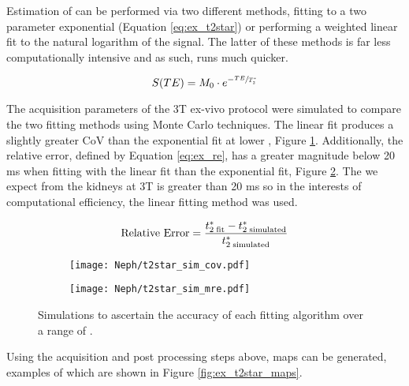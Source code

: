 Estimation of \ttwostar can be performed via two different methods, fitting to a two parameter exponential (Equation \eqref{eq:ex_t2star}) or performing a weighted linear fit to the natural logarithm of the signal. The latter of these methods is far less computationally intensive and as such, runs much quicker.

\begin{equation}
	S(TE) = M_0 \cdot e^{-\sfrac{TE}{T_2^*}}
	\label{eq:ex_t2star}
\end{equation}

The acquisition parameters of the 3T ex-vivo protocol were simulated to compare the two fitting methods using Monte Carlo techniques. The linear fit produces a slightly greater \ac{CoV} than the exponential fit at lower \ttwostar, Figure \ref{fig:ex_t2star_sim_cov}. Additionally, the relative error, defined by Equation \eqref{eq:ex_re}, has a greater magnitude below 20 ms when fitting with the linear fit than the exponential fit, Figure \ref{fig:ex_t2star_sim_mre}. The \ttwostar we expect from the kidneys at 3T is greater than 20 ms so in the interests of computational efficiency, the linear fitting method was used.

\begin{equation}
	\textup{Relative Error} = \frac{t_{2\; \textup{fit}}^{*} - t_{2\; \textup{simulated}}^{*}}{t_{2\; \textup{simulated}}^{*}}
	\label{eq:ex_re}
\end{equation}

\begin{figure}[H]
	\centering
	\begin{subfigure}[c]{0.47\textwidth}
		\centering
		\texttt{[image: Neph/t2star\_sim\_cov.pdf]}
		\caption{}
		\label{fig:ex_t2star_sim_cov}
	\end{subfigure}
	\hfill
	\begin{subfigure}[c]{0.47\textwidth}
		\centering
		\texttt{[image: Neph/t2star\_sim\_mre.pdf]}
		\caption{}
		\label{fig:ex_t2star_sim_mre}
	\end{subfigure}
	\caption{Simulations to ascertain the accuracy of each \ttwostar fitting algorithm over a range of \ttwostar.}
	\label{fig:ex_t2star_sim}
\end{figure}

Using the acquisition and post processing steps above, \ttwostar maps can be generated, examples of which are shown in Figure \ref{fig:ex_t2star_maps}.

